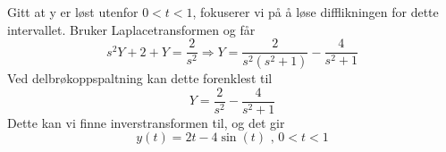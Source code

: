 \documentclass[11pt, a4paper, norsk]{NTNUoving}
\begin{document}
\begin{oppgave}[25]
  Gitt at y er løst utenfor $0<t<1$, fokuserer vi på å løse difflikningen for dette intervallet. Bruker Laplacetransformen og får
  \[
    s^{2}Y+2+Y=\frac{2}{s^{2}}\Rightarrow Y=\frac{2}{s^{2}(s^{2}+1)}-\frac{4}{s^{2}+1}
  \]
  Ved delbrøkoppspaltning kan dette forenklest til
  \[
    Y=\frac{2}{s^{2}}-\frac{4}{s^{2}+1}
  \]
  Dette kan vi finne inverstransformen til, og det gir
  \[
    y(t)=2t-4\sin(t)\text{   , } 0<t<1
  \]
\end{oppgave}
\end{document}

